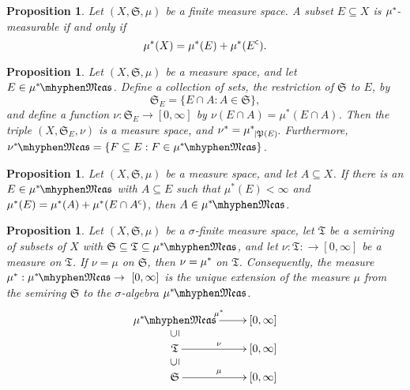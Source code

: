 \documentclass[
twoside=true,
paper=letter,
fontsize=9pt,
pagesize=auto,
leqno,
openany,
headsepline,
overfullrule,
]{scrbook}
\theoremstyle{plain}
\theoremstyle{plain}
\newtheorem{prop}[thm]{Proposition}
\theoremstyle{definition}
\theoremstyle{bfnoteitalic}
\theoremstyle{bfnoteroman}
\newcommand{\sigalg}[1]{\mathfrak{#1}}
\newcommand{\subsetequp}{\rotatebox{90}{$\subseteq$}}
\newcommand{\textsigma}{\hbox{\large{$\sigma$}}\kern-1pt}
\newcommand{\restrictedto}[1]{_{\lvert#1}\kern-1.5pt}
\newcommand{\comp}{^{\hbox{\tiny{$\mathsf C$}}}}
\newcommand{\meets}{\cap}
\newcommand{\semiring}{\sigalg{S}}
\newcommand{\semiringii}{\sigalg{T}}
\newcommand{\powerset}{\mathfrak{P}}
\newcommand{\measurable}[1]{{#1}\mhyphen\mathfrak{Meas}}
\newcommand{\kernast}{\ast\kern-1pt}
\newcommand{\measurespace}{X}
\newcommand{\measure}{\mu}
\newcommand{\measmu}{\mu}
\newcommand{\measureii}{\nu}
\newcommand{\measnu}{\nu}
\begin{document}
\begin{prop}
Let $(\measurespace, \semiring, \measure)$ be a finite measure space.  
A subset $E\subseteq \measurespace$ is $\measure^\kernast$\hyp{}measurable if and only if 
\[
\measure^*(\measurespace) = \measure^*(E) + \measure^*(E\comp).
\]
\end{prop}



\begin{prop}
Let $(\measurespace, \semiring, \measure)$ be a measure space, and let 
$E\in \measurable{\measure^\kernast}$. Define a collection of sets, the restriction of $\semiring$ to $E$, by
\[
\semiring_E = \{ E\meets A: A\in\semiring \},
\]
and define a function $\measureii:\semiring_E\to [0,\infty]$ by $\measureii(E\meets A)=\measure^*(E\meets A)$.
Then the triple $(\measurespace, \semiring_E, \measureii )$ is a measure space, and 
$\measureii^* ={\measure^\kernast}\restrictedto{\powerset(E)}$. Furthermore, 
$\measurable{\measureii^\kernast} 
= 
\{ F\subseteq E : F\in \measurable{\measure^\kernast} \}$.
\end{prop}


\begin{prop}\label{sufficient_for_measurability}
Let $(\measurespace, \semiring, \measure)$ be a measure space, and let $A \subseteq \measurespace$.  If there is an $E\in\measurable{\measure^\kernast}$ with $A\subseteq E$ such that $\measure^*(E) < \infty$ and $\measure^*(E) = \measure^*(A) + \measure^*(E\meets A\comp)$, then 
$A\in\measurable{\measure^\kernast}$.
\end{prop}



\begin{prop}\label{extension_measure}
Let $(\measurespace, \semiring, \measure)$ be a \textsigma-finite measure space, let $\semiringii$ be a semiring of subsets of $\measurespace$ with 
$\semiring \subseteq \semiringii\subseteq\measurable{\measure^\kernast}$,
and let $\measureii:\semiringii:\to [0,\infty]$ be a measure on $\semiringii$.
If $\measureii=\measure$ on $\semiring$, then $\measureii = \measure^\kernast$ on $\semiringii$.
Consequently, the measure 
$\measure^* : \measurable{\measure^\kernast} \to\ [0, \infty]$ 
is the unique extension of the measure $\measure$ from the semiring $\semiring$ 
to the \textsigma\hyp{}algebra 
$\measurable{\measure^\kernast}$.
\[
\xymatrix@R=-2pt{
\measurable{\measure^\kernast} \ar[r]^{\measmu^*} & [0, \infty ] \\
\subsetequp & \\
\semiringii \ar[r]^\measnu & [0, \infty ] \\
\subsetequp & \\
\semiring   \ar[r]^\measmu & [0, \infty ] \\
}
\]
\end{prop}
\end{document}

